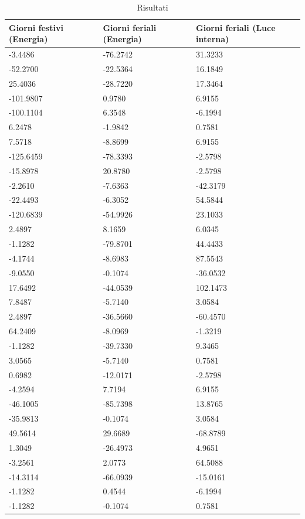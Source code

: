\begin{table}
  \caption{Risultati}
  \centering
	\begin{tabular}{lll}
		\toprule
    Giorni festivi (Energia) & Giorni feriali (Energia) & Giorni feriali (Luce interna) \\
		\midrule
    -3.4486 & -76.2742 & 31.3233 \\
    -52.2700 & -22.5364 & 16.1849 \\
    25.4036 & -28.7220 & 17.3464 \\
    -101.9807 & 0.9780 & 6.9155 \\
    -100.1104 & 6.3548 & -6.1994 \\
    6.2478 & -1.9842 & 0.7581 \\
    7.5718 & -8.8699 & 6.9155 \\
    -125.6459 & -78.3393 & -2.5798 \\
    -15.8978 & 20.8780 & -2.5798 \\
    -2.2610 & -7.6363 & -42.3179 \\
    -22.4493 & -6.3052 & 54.5844 \\
    -120.6839 & -54.9926 & 23.1033 \\
    2.4897 & 8.1659 & 6.0345 \\
    -1.1282 & -79.8701 & 44.4433 \\
    -4.1744 & -8.6983 & 87.5543 \\
    -9.0550 & -0.1074 & -36.0532 \\
    17.6492 & -44.0539 & 102.1473 \\
    7.8487 & -5.7140 & 3.0584 \\
    2.4897 & -36.5660 & -60.4570 \\
    64.2409 & -8.0969 & -1.3219 \\
    -1.1282 & -39.7330 & 9.3465 \\
    3.0565 & -5.7140 & 0.7581 \\
    0.6982 & -12.0171 & -2.5798 \\
    -4.2594 & 7.7194 & 6.9155 \\
    -46.1005 & -85.7398 & 13.8765 \\
    -35.9813 & -0.1074 & 3.0584 \\
    49.5614 & 29.6689 & -68.8789 \\
    1.3049 & -26.4973 & 4.9651 \\
    -3.2561 & 2.0773 & 64.5088 \\
    -14.3114 & -66.0939 & -15.0161 \\
    -1.1282 & 0.4544 & -6.1994 \\
    -1.1282 & -0.1074 & 0.7581 \\
		\bottomrule
	\end{tabular}
\end{table}

\clearpage
